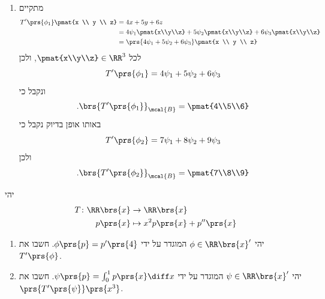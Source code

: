 \documentclass[a4paper,10pt,twoside,openany]{book}
\begin{document}
\begin{solution}
\begin{enumerate}
\item 
מתקיים
\begin{align*}
T'\prs{\phi_1} \pmat{x \\ y \\ z} &= 4x + 5y + 6z \\&= 4\psi_1\pmat{x\\y\\z} + 5\psi_2\pmat{x\\y\\z} + 6\psi_3\pmat{x\\y\\z}
\\&=
\prs{4 \psi_1 + 5 \psi_2 + 6 \psi_3} \pmat{x \\ y \\ z}
\end{align*}
לכל
$\pmat{x\\y\\z} \in \RR^3$,
ולכן
\[T'\prs{\phi_1} = 4 \psi_1 + 5 \psi_2 + 6 \psi_3\]
ונקבל כי
\begin{align*}
\text{.} \brs{T'\prs{\phi_1}}_\mcal{B} = \pmat{4\\5\\6}
\end{align*}
באותו אופן בדיוק נקבל כי
\[T'\prs{\phi_2} = 7 \psi_1 + 8 \psi_2 + 9 \psi_3\]
ולכן
\begin{align*}
\text{.} \brs{T'\prs{\phi_2}}_\mcal{B} = \pmat{7\\8\\9}
\end{align*}
\end{enumerate}
\end{solution}

\begin{exercisechap}
יהי
\begin{align*}
T \colon \RR\brs{x} &\to \RR\brs{x} \\
p\prs{x} &\mapsto x^2 p\prs{x} + p''\prs{x}
\end{align*}

\begin{enumerate}
\item יהי
$\phi \in \RR\brs{x}'$
המוגדר על ידי
$\phi\prs{p} = p'\prs{4}$.
חשבו את
$T'\prs{\phi}$.

\item יהי
$\psi \in \RR\brs{x}'$
המוגדר על ידי
$\psi\prs{p} = \int_0^1 p\prs{x} \diff x$.
חשבו את
$\prs{T'\prs{\psi}}\prs{x^3}$.
\end{enumerate}
\end{exercisechap}
\end{document}
